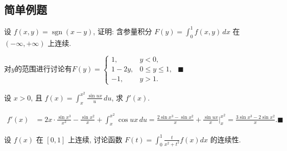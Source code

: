 \documentclass[lang=cn,newtx,10pt,scheme=chinese]{elegantbook}
\begin{document}
\subsection{简单例题}
\begin{example}
设 $f(x,y) = \operatorname{sgn}(x-y)$, 证明: 含参量积分 $F(y) = \int_{0}^{1} f(x,y) \,dx$ 在 $(-\infty, +\infty)$ 上连续.
\end{example}
\begin{solution}
对$y$的范围进行讨论有$F(y) = \begin{cases} 1, & y < 0, \\ 1-2y, & 0 \le y \le 1, \\ -1, & y > 1. \end{cases} $ $\blacksquare$
\end{solution} 

\begin{example}
设 $x>0$, 且 $f(x) = \int_{x}^{x^2} \frac{\sin ux}{u} \,du$, 求 $f'(x)$.
\end{example}
\begin{solution}
\begin{align*}
f'(x) &= 2x \cdot \frac{\sin x^3}{x^2} - \frac{\sin x^2}{x} + \int_{x}^{x^2} \cos ux \,du = \frac{2\sin x^3 - \sin x^2}{x} + \frac{\sin ux}{x} \bigg|_{x}^{x^2} = \frac{3\sin x^3 - 2\sin x^2}{x}. \blacksquare
\end{align*}

\end{solution}

\begin{example}[$\bigstar$]
设 $f(x)$ 在 $[0,1]$ 上连续, 讨论函数 $F(t) = \int_0^1 \frac{t}{x^2+t^2}f(x)dx$ 的连续性.
\end{example}
\end{document}
